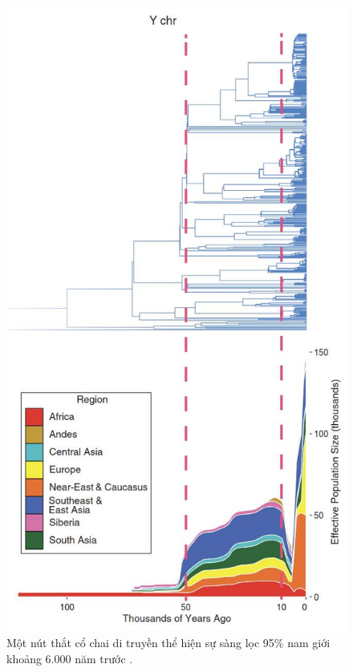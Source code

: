\documentclass[10pt,twocolumn,letterpaper]{article}
\begin{document}
\begin{figure}[b]
\begin{center}
   \includegraphics[width=1\linewidth]{bottleneck.jpg}
\end{center}
   \caption{Một nút thắt cổ chai di truyền thể hiện sự sàng lọc 95\% nam giới khoảng 6.000 năm trước \cite{62}.}
\label{fig:10}
\label{fig:onecol}
\end{figure}
\end{document}
